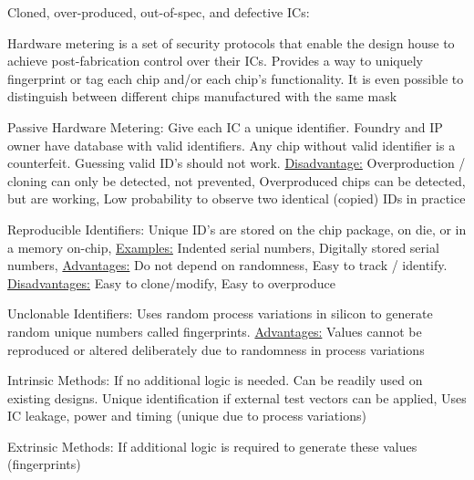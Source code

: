 \documentclass[landscape, a4paper]{article}
\begin{document}
\begin{minipage}[t]{0.2\linewidth}
\begin{betterlist}
\begin{betterlist}
\begin{betterlist}
\begin{betterlist}
\begin{betterlist}
					\end{betterlist}
				\end{betterlist}
			\end{betterlist}
		\end{betterlist}
		\item \alert{Cloned, over-produced, out-of-spec, and defective ICs:}
		\begin{betterlist}
			\item \alert{Hardware metering} is a set of security protocols that enable the design house to achieve post-fabrication control over their ICs.  Provides a way to uniquely fingerprint or tag each chip and/or each chip’s functionality. It is even possible to distinguish between different chips manufactured with the same mask
			\item \alert{Passive Hardware Metering:} Give each IC a unique identifier. Foundry and IP owner have database with valid identifiers. Any chip without valid identifier is a counterfeit. Guessing valid ID's should not work. \underline{Disadvantage:} Overproduction / cloning can only be detected, not prevented, Overproduced chips can be detected, but are working, Low probability to observe two identical (copied) IDs in practice
			\begin{betterlist}
				\item \alert{Reproducible Identifiers:} Unique ID’s are stored on the chip package, on die, or in a memory on-chip, \underline{Examples:} Indented serial numbers, Digitally stored serial numbers, \underline{Advantages:} Do not depend on randomness, Easy to track / identify. \underline{Disadvantages:} Easy to clone/modify, Easy to overproduce
				\item \alert{Unclonable Identifiers:} Uses random process variations in silicon to generate random unique numbers called \alert{fingerprints}. \underline{Advantages:} Values cannot be reproduced or altered deliberately due to randomness in process variations
				\begin{betterlist}
					\item \alert{Intrinsic Methods:} If no additional logic is needed. Can be readily used on existing designs. Unique identification if external test vectors can be applied, Uses IC leakage, power and timing (unique due to process variations)%
					\item \alert{Extrinsic Methods:} If additional logic is required to generate these values (fingerprints)
					\begin{betterlist}

\end{betterlist}
\end{betterlist}
\end{betterlist}
\end{betterlist}
\end{betterlist}
\end{minipage}
\end{document}
